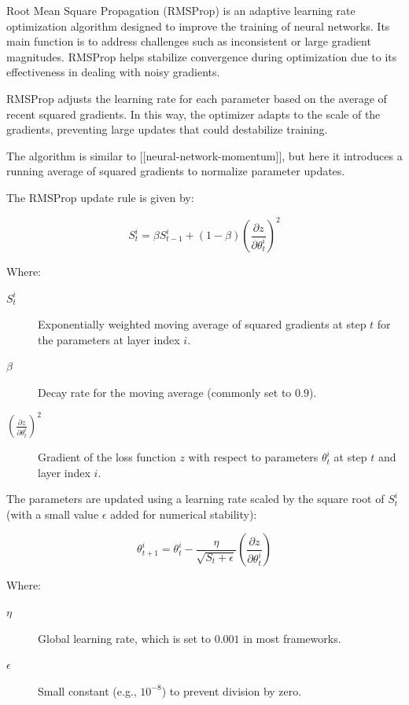 		Root Mean Square Propagation (RMSProp) is an adaptive learning rate optimization algorithm designed to improve the training of neural networks. Its main function is to address challenges such as inconsistent or large gradient magnitudes. RMSProp helps stabilize convergence during optimization due to its effectiveness in dealing with noisy gradients.
		
		RMSProp adjusts the learning rate for each parameter based on the average of recent squared gradients. In this way, the optimizer adapts to the scale of the gradients, preventing large updates that could destabilize training.  
		
		The algorithm is similar to [[neural-network-momentum]], but here it introduces a running average of squared gradients to normalize parameter updates.
		
		The RMSProp update rule is given by:
		
		\begin{equation}
			S^i_t = \beta S^i_{t-1} + (1 - \beta) \left( \frac{\partial z}{\partial \theta^i_{t}} \right)^2
		\end{equation}

		
		Where:
		\begin{description}
			\item[$S^i_t$] Exponentially weighted moving average of squared gradients at step $t$ for the parameters at layer index $i$.
			\item[$\beta$] Decay rate for the moving average (commonly set to $0.9$).
			\item[$\left( \frac{\partial z}{\partial \theta^i_{t}} \right)^2$] Gradient of the loss function $z$ with respect to parameters $\theta^i_t$ at step $t$ and layer index $i$.
		\end{description}
		\bigskip
		
		
		The parameters are updated using a learning rate scaled by the square root of $S^i_t$ (with a small value $\epsilon$ added for numerical stability):
		
		\begin{equation}
			\theta^i_{t+1} = \theta^i_t - \frac{\eta}{\sqrt{S_t + \epsilon}} 
			\left( \frac{\partial z}{\partial \theta^i_{t}} \right)
		\end{equation}
		
				
		Where:
		\begin{description}
			\item[$\eta$] Global learning rate, which is set to $0.001$ in most frameworks.
			\item[$\epsilon$] Small constant (e.g., $10^{-8}$) to prevent division by zero.
		\end{description}
		\bigskip

